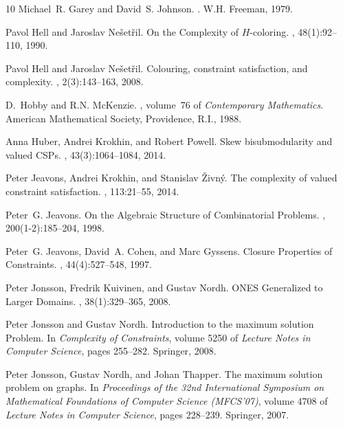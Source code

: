 \documentclass[11pt, reqno]{article}
\theoremstyle{remark}
\begin{document}
\begin{thebibliography}{10}
Michael~R. Garey and David~S. Johnson.
.
\newblock W.H. Freeman, 1979.

Pavol Hell and Jaroslav Ne\v{s}et\v{r}il.
\newblock On the {C}omplexity of {${H}$}-coloring.
, 48(1):92--110, 1990.

Pavol Hell and Jaroslav Ne\v{s}et\v{r}il.
\newblock Colouring, constraint satisfaction, and complexity.
, 2(3):143--163, 2008.

D.~Hobby and R.N. McKenzie.
, volume~76 of {\em
  Contemporary Mathematics}.
\newblock American Mathematical Society, Providence, R.I., 1988.

Anna Huber, Andrei Krokhin, and Robert Powell.
\newblock Skew {b}isubmodularity and {v}alued {C}{S}{P}s.
, 43(3):1064--1084, 2014.

Peter Jeavons, Andrei Krokhin, and Stanislav {\v{Z}}ivn\'y.
\newblock The complexity of valued constraint satisfaction.
, 113:21--55, 2014.

Peter~G. Jeavons.
\newblock On the {A}lgebraic {S}tructure of {C}ombinatorial {P}roblems.
, 200(1-2):185--204, 1998.

Peter~G. Jeavons, David~A. Cohen, and Marc Gyssens.
\newblock Closure {P}roperties of {C}onstraints.
, 44(4):527--548, 1997.

Peter Jonsson, Fredrik Kuivinen, and Gustav Nordh.
 {ONES} {G}eneralized to {L}arger {D}omains.
, 38(1):329--365, 2008.

Peter Jonsson and Gustav Nordh.
\newblock Introduction to the {\sc maximum solution} {P}roblem.
\newblock In {\em Complexity of {C}onstraints}, volume 5250 of {\em Lecture
  Notes in Computer Science}, pages 255--282. Springer, 2008.

Peter Jonsson, Gustav Nordh, and Johan Thapper.
\newblock The maximum solution problem on graphs.
\newblock In {\em Proceedings of the 32nd International Symposium on
  Mathematical Foundations of Computer Science (MFCS'07)}, volume 4708 of {\em
  Lecture Notes in Computer Science}, pages 228--239. Springer, 2007.


\end{thebibliography}
\end{document}
